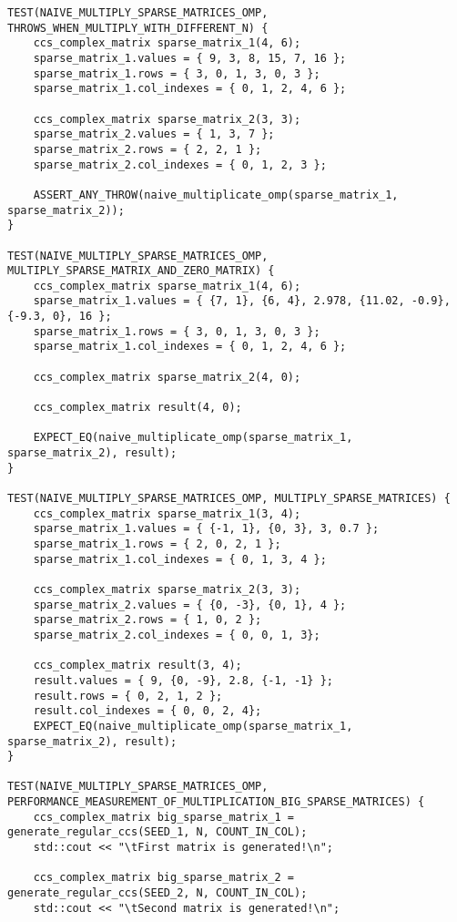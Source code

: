 \documentclass{report}
\begin{document}
\begin{itemize}
\begin{itemize}
\begin{lstlisting}
TEST(NAIVE_MULTIPLY_SPARSE_MATRICES_OMP, THROWS_WHEN_MULTIPLY_WITH_DIFFERENT_N) {
    ccs_complex_matrix sparse_matrix_1(4, 6);
    sparse_matrix_1.values = { 9, 3, 8, 15, 7, 16 };
    sparse_matrix_1.rows = { 3, 0, 1, 3, 0, 3 };
    sparse_matrix_1.col_indexes = { 0, 1, 2, 4, 6 };

    ccs_complex_matrix sparse_matrix_2(3, 3);
    sparse_matrix_2.values = { 1, 3, 7 };
    sparse_matrix_2.rows = { 2, 2, 1 };
    sparse_matrix_2.col_indexes = { 0, 1, 2, 3 };

    ASSERT_ANY_THROW(naive_multiplicate_omp(sparse_matrix_1, sparse_matrix_2));
}

TEST(NAIVE_MULTIPLY_SPARSE_MATRICES_OMP, MULTIPLY_SPARSE_MATRIX_AND_ZERO_MATRIX) {
    ccs_complex_matrix sparse_matrix_1(4, 6);
    sparse_matrix_1.values = { {7, 1}, {6, 4}, 2.978, {11.02, -0.9}, {-9.3, 0}, 16 };
    sparse_matrix_1.rows = { 3, 0, 1, 3, 0, 3 };
    sparse_matrix_1.col_indexes = { 0, 1, 2, 4, 6 };

    ccs_complex_matrix sparse_matrix_2(4, 0);

    ccs_complex_matrix result(4, 0);

    EXPECT_EQ(naive_multiplicate_omp(sparse_matrix_1, sparse_matrix_2), result);
}

TEST(NAIVE_MULTIPLY_SPARSE_MATRICES_OMP, MULTIPLY_SPARSE_MATRICES) {
    ccs_complex_matrix sparse_matrix_1(3, 4);
    sparse_matrix_1.values = { {-1, 1}, {0, 3}, 3, 0.7 };
    sparse_matrix_1.rows = { 2, 0, 2, 1 };
    sparse_matrix_1.col_indexes = { 0, 1, 3, 4 };

    ccs_complex_matrix sparse_matrix_2(3, 3);
    sparse_matrix_2.values = { {0, -3}, {0, 1}, 4 };
    sparse_matrix_2.rows = { 1, 0, 2 };
    sparse_matrix_2.col_indexes = { 0, 0, 1, 3};

    ccs_complex_matrix result(3, 4);
    result.values = { 9, {0, -9}, 2.8, {-1, -1} };
    result.rows = { 0, 2, 1, 2 };
    result.col_indexes = { 0, 0, 2, 4};
    EXPECT_EQ(naive_multiplicate_omp(sparse_matrix_1, sparse_matrix_2), result);
}

TEST(NAIVE_MULTIPLY_SPARSE_MATRICES_OMP, PERFORMANCE_MEASUREMENT_OF_MULTIPLICATION_BIG_SPARSE_MATRICES) {
    ccs_complex_matrix big_sparse_matrix_1 = generate_regular_ccs(SEED_1, N, COUNT_IN_COL);
    std::cout << "\tFirst matrix is generated!\n";

    ccs_complex_matrix big_sparse_matrix_2 = generate_regular_ccs(SEED_2, N, COUNT_IN_COL);
    std::cout << "\tSecond matrix is generated!\n";


\end{lstlisting}
\end{itemize}
\end{itemize}
\end{document}
